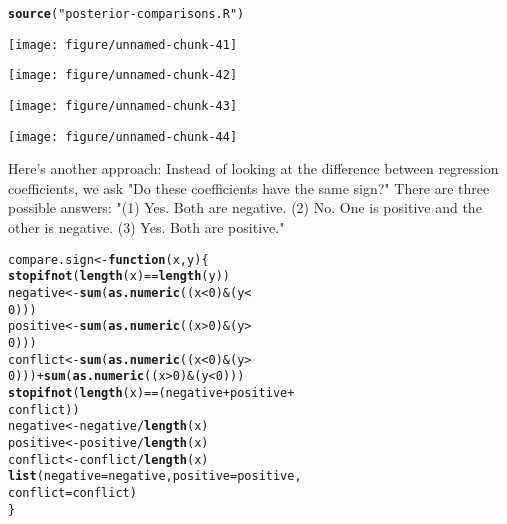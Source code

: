 \documentclass[12pt]{article}\usepackage[]{graphicx}\usepackage[]{color}
\makeatletter
\def\maxwidth{ %
  \ifdim\Gin@nat@width>\linewidth
    \linewidth
  \else
    \Gin@nat@width
  \fi
}
\newcommand{\hlnum}[1]{\textcolor[rgb]{0.686,0.059,0.569}{#1}}%
\newcommand{\hlstr}[1]{\textcolor[rgb]{0.192,0.494,0.8}{#1}}%
\newcommand{\hlopt}[1]{\textcolor[rgb]{0,0,0}{#1}}%
\newcommand{\hlstd}[1]{\textcolor[rgb]{0.345,0.345,0.345}{#1}}%
\newcommand{\hlkwa}[1]{\textcolor[rgb]{0.161,0.373,0.58}{\textbf{#1}}}%
\newcommand{\hlkwb}[1]{\textcolor[rgb]{0.69,0.353,0.396}{#1}}%
\newcommand{\hlkwc}[1]{\textcolor[rgb]{0.333,0.667,0.333}{#1}}%
\newcommand{\hlkwd}[1]{\textcolor[rgb]{0.737,0.353,0.396}{\textbf{#1}}}%
\newenvironment{kframe}{%
 \def\at@end@of@kframe{}%
 \ifinner\ifhmode%
  \def\at@end@of@kframe{\end{minipage}}%
  \begin{minipage}{\columnwidth}%
 \fi\fi%
 \def\FrameCommand##1{\hskip\@totalleftmargin \hskip-\fboxsep
 \colorbox{shadecolor}{##1}\hskip-\fboxsep
     \hskip-\linewidth \hskip-\@totalleftmargin \hskip\columnwidth}%
 \MakeFramed {\advance\hsize-\width
   \@totalleftmargin\z@ \linewidth\hsize
   \@setminipage}}%
 {\par\unskip\endMakeFramed%
 \at@end@of@kframe}
\newenvironment{knitrout}{}{} %
\makeatother
\begin{document}
\begin{knitrout}
\color{fgcolor}\begin{kframe}
\begin{alltt}
\hlkwd{source}\hlstd{(}\hlstr{"posterior-comparisons.R"}\hlstd{)}
\end{alltt}


{\ttfamily\noindent\itshape\color{messagecolor}{\#\# Loading required package: ggplot2}}\end{kframe}
\texttt{[image: figure/unnamed-chunk-41]} 

\texttt{[image: figure/unnamed-chunk-42]} 

\texttt{[image: figure/unnamed-chunk-43]} 

\texttt{[image: figure/unnamed-chunk-44]} 

\end{knitrout}

Here's another approach: Instead of looking at the difference between
regression coefficients, we ask "Do these coefficients have the same
sign?" There are three possible answers: "(1) Yes. Both are
negative. (2) No. One is positive and the other is negative. (3)
Yes. Both are positive."

\begin{knitrout}
\color{fgcolor}\begin{kframe}
\begin{alltt}
\hlstd{compare.sign} \hlkwb{<-} \hlkwa{function}\hlstd{(}\hlkwc{x}\hlstd{,} \hlkwc{y}\hlstd{) \{}
  \hlkwd{stopifnot}\hlstd{(}\hlkwd{length}\hlstd{(x)} \hlopt{==} \hlkwd{length}\hlstd{(y))}
  \hlstd{negative} \hlkwb{<-} \hlkwd{sum}\hlstd{(}\hlkwd{as.numeric}\hlstd{((x} \hlopt{<} \hlnum{0}\hlstd{)} \hlopt{&} \hlstd{(y} \hlopt{<}
    \hlnum{0}\hlstd{)))}
  \hlstd{positive} \hlkwb{<-} \hlkwd{sum}\hlstd{(}\hlkwd{as.numeric}\hlstd{((x} \hlopt{>} \hlnum{0}\hlstd{)} \hlopt{&} \hlstd{(y} \hlopt{>}
    \hlnum{0}\hlstd{)))}
  \hlstd{conflict} \hlkwb{<-} \hlkwd{sum}\hlstd{(}\hlkwd{as.numeric}\hlstd{((x} \hlopt{<} \hlnum{0}\hlstd{)} \hlopt{&} \hlstd{(y} \hlopt{>}
    \hlnum{0}\hlstd{)))} \hlopt{+} \hlkwd{sum}\hlstd{(}\hlkwd{as.numeric}\hlstd{((x} \hlopt{>} \hlnum{0}\hlstd{)} \hlopt{&} \hlstd{(y} \hlopt{<} \hlnum{0}\hlstd{)))}
  \hlkwd{stopifnot}\hlstd{(}\hlkwd{length}\hlstd{(x)} \hlopt{==} \hlstd{(negative} \hlopt{+} \hlstd{positive} \hlopt{+}
    \hlstd{conflict))}
  \hlstd{negative} \hlkwb{<-} \hlstd{negative}\hlopt{/}\hlkwd{length}\hlstd{(x)}
  \hlstd{positive} \hlkwb{<-} \hlstd{positive}\hlopt{/}\hlkwd{length}\hlstd{(x)}
  \hlstd{conflict} \hlkwb{<-} \hlstd{conflict}\hlopt{/}\hlkwd{length}\hlstd{(x)}
  \hlkwd{list}\hlstd{(}\hlkwc{negative} \hlstd{= negative,} \hlkwc{positive} \hlstd{= positive,}
    \hlkwc{conflict} \hlstd{= conflict)}
\hlstd{\}}
\end{alltt}
\end{kframe}
\end{knitrout}
\end{document}
